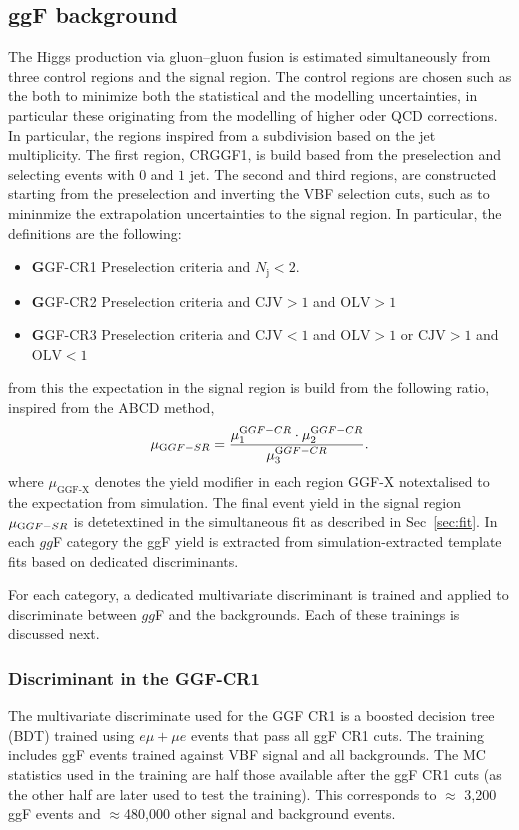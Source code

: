\subsection{ggF background}
The Higgs production via gluon--gluon fusion is estimated simultaneously from three control regions and the signal region. The control regions are chosen such as the both to minimize both the statistical and the modelling uncertainties, in particular these originating from the modelling of higher oder QCD corrections. In particular, the regions inspired from a subdivision based on the jet multiplicity. The first region, CRGGF1, is build based from the preselection and selecting events with $0$ and $1$ jet. The second and third regions, are constructed starting from the preselection and inverting the VBF selection cuts, such as to mininmize the extrapolation uncertainties to the signal region. In particular, the definitions are the following: 
\begin{itemize} 
\item {\textbf GGF-CR1} Preselection criteria and $N_{ \text{j}}<2$. 
\item {\textbf GGF-CR2} Preselection criteria and $\text{CJV} > 1$ and $\text{OLV} > 1$
\item {\textbf GGF-CR3} Preselection criteria and $\text{CJV}<1$ and $\text{OLV}>1$ or $\text{CJV}>1$ and $\text{OLV}<1$ 
\end{itemize} 
\noindent from this the expectation in the signal region is build from the following ratio, inspired from the  ABCD method, 
\begin{equation}
	\mu_{{\text GGF-SR}} = \frac{\mu^{{\text GGF-CR}}_{1} \cdot\mu^{{\text GGF-CR}}_{2}}{ \mu^{{\text GGF-CR}}_{3}}.
\end{equation}
\noindent where $\mu_{\text{GGF-X}}$ denotes the yield modifier in each region GGF-X notextalised to the expectation from simulation. The final event yield in the signal region $\mu_{{\text GGF-SR}}$ is detetextined in the simultaneous fit as described in Sec~\ref{sec:fit}. In each $gg$F category the ggF yield is extracted from simulation-extracted template fits based on dedicated discriminants. 

For each category, a dedicated multivariate discriminant is trained and applied to discriminate between $gg$F and the backgrounds. Each of these trainings is discussed next. 

\subsubsection{Discriminant in the GGF-CR1}
The multivariate discriminate used for the GGF CR1 is a boosted decision tree (BDT) trained using $e\mu+\mu e$ events that pass all ggF CR1 cuts. The training includes ggF events trained against VBF signal and all backgrounds. The MC statistics used in the training are half those available after the ggF CR1 cuts (as the other half are later used to test the training). This corresponds to $\approx$ 3,200 ggF events and $\approx$480,000 other signal and background events.

